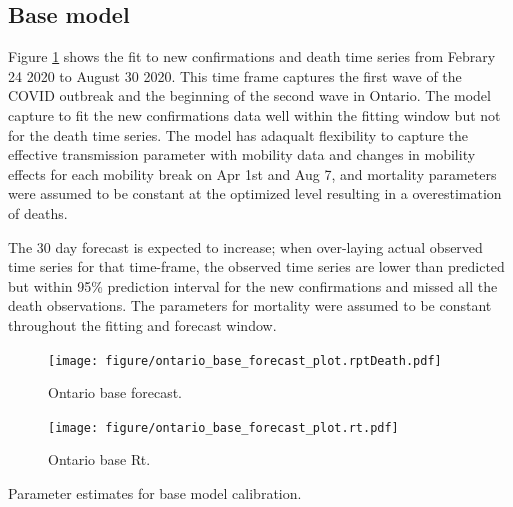 \documentclass[12pt]{article}\usepackage[]{graphicx}\usepackage[]{color}
\begin{document}
\subsection{Base model}

Figure \ref{fig:Ont_calibration_base_forecast} shows the fit to new confirmations and death time series from Febrary 24 2020 to August 30 2020. This time frame captures the first wave of the COVID outbreak and the beginning of the second wave in Ontario. The model capture to fit the new confirmations data well within the fitting window but not for the death time series. The model has adaqualt flexibility to capture the effective transmission parameter with mobility data and changes in mobility effects for each mobility break on Apr 1st and Aug 7, and mortality parameters were assumed to be constant at the optimized level resulting in a overestimation of deaths. 

The 30 day forecast is expected to increase; when over-laying actual observed time series for that time-frame, the observed time series are lower than predicted but within 95\% prediction interval for the new confirmations and missed all the death observations. The parameters for mortality were assumed to be constant throughout the fitting and forecast window. 


\begin{figure}[ht!]
\texttt{[image: figure/ontario\_base\_forecast\_plot.rptDeath.pdf]}

\caption{Ontario base forecast. }
\label{fig:Ont_calibration_base_forecast}
\end{figure}

\begin{figure}[ht!]
\texttt{[image: figure/ontario\_base\_forecast\_plot.rt.pdf]}

\caption{Ontario base Rt. }
\label{fig:Ont_calibration_base_rt}
\end{figure}

\begin{table}
\centering

\caption{
  \label{tab:estparm}
  Parameter estimates for base model calibration. 
}
\end{table}
\end{document}
